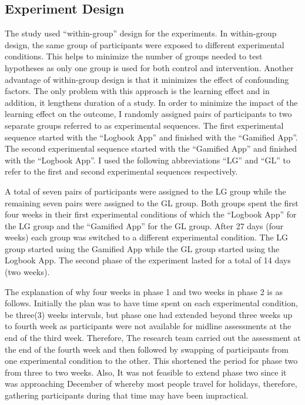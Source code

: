 \subsection{Experiment Design}
The study used ``within-group'' design for the experiments. In within-group design, the same group of participants were exposed to different experimental conditions. This helps to minimize the number of groups needed to test hypotheses as only one group is used for both control and intervention. Another advantage of within-group design is that it minimizes the effect of confounding factors. The only problem with this approach is the learning effect and in addition, it lengthens duration of a study. In order to minimize the impact of the learning effect on the outcome, I randomly assigned pairs of participants to two separate groups referred to as experimental sequences. The first experimental sequence started with the ``Logbook App''  and finished with the ``Gamified App''. The second experimental sequence started with the ``Gamified App'' and finished with the ``Logbook App''. I used the following abbreviations ``LG'' and ``GL'' to refer to the first and second experimental sequences respectively.

A total of seven pairs of participants were assigned to the LG group while the remaining seven pairs were assigned to the GL group. Both groups spent the first four weeks in their first experimental conditions of which the ``Logbook App'' for the LG group and the ``Gamified App'' for the GL group. After 27 days (four weeks) each group was switched to a different experimental condition. The LG group started using the Gamified App while the GL group started using the Logbook App. The second phase of the experiment lasted for a total of 14 days (two weeks). 

The explanation of why four weeks in phase 1 and two weeks in phase 2 is as follows. Initially the plan was to have time spent on each experimental condition, be three(3) weeks intervals, but phase one had extended beyond three weeks up to fourth week as participants were not available for midline assessments at the end of the third week. Therefore, The research team carried out the assessment at the end of the fourth week and then followed by swapping of participants from one experimental condition to the other. This shortened the period for phase two from three to two weeks. Also, It was not feasible to extend phase two since it was approaching December of whereby most people travel for holidays, therefore, gathering participants during that time may have been impractical.
